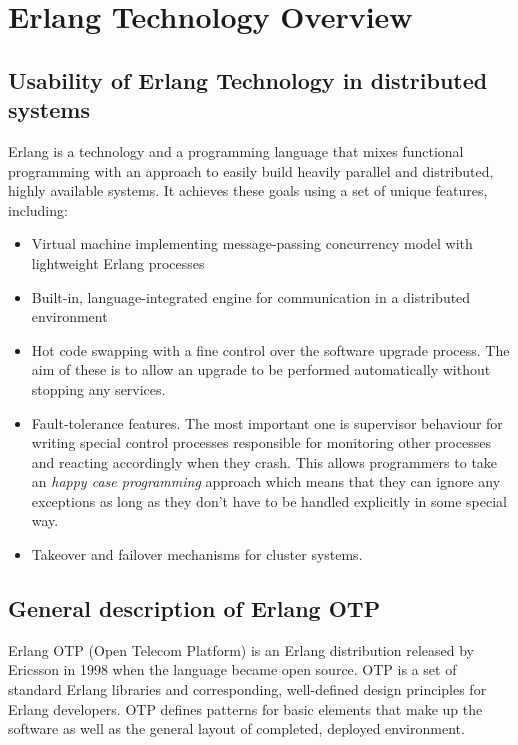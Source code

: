 \section{Erlang Technology Overview}

\subsection{Usability of Erlang Technology in distributed systems}

Erlang is a technology and a programming language that mixes functional programming with
an approach to easily build heavily parallel and distributed, highly available systems. It achieves
these goals using a set of unique features, including:

\begin{itemize}

\item Virtual machine implementing message-passing concurrency model with
lightweight Erlang processes
\item Built-in, language-integrated engine for communication in a distributed environment
\item Hot code swapping with a fine control over the software upgrade process. The aim of these
is to allow an upgrade to be performed automatically without stopping any services.
\item Fault-tolerance features. The most important one is supervisor behaviour for writing
special control processes responsible for monitoring other processes
and reacting accordingly when they crash. This allows programmers to take an \emph{happy case programming}
approach which means that they can ignore any exceptions as long as they don't have to be handled explicitly in
some special way.
\item Takeover and failover mechanisms for cluster systems.

\end{itemize}

\subsection{General description of Erlang OTP}

Erlang OTP (Open Telecom Platform) is an Erlang distribution released by Ericsson in 1998
when the language became open source. OTP is a set of standard Erlang libraries and
corresponding, well-defined design principles for Erlang developers. OTP defines patterns
for basic elements that make up the software as well as the general layout of completed,
deployed environment.

